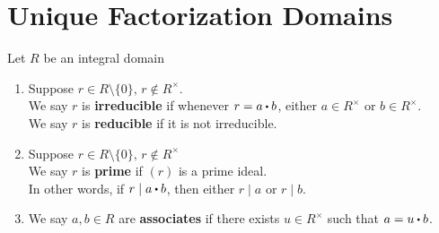 \documentclass[../Main.tex]{subfiles}
\begin{document}
\chapter{Unique Factorization Domains}
\begin{dfn}[title = {Irreducible/Reducible, Prime, Associate Elements}]
	Let $R$ be an integral domain
	\begin{enumerate}
		\item Suppose $r\in R\setminus\{0\},\, r\notin R^\times$.\\
		We say $r$ is \textbf{irreducible} if whenever $r=a\rdot b$, either $a\in R^\times$ or $b\in R^\times$.\\
		We say $r$ is \textbf{reducible} if it is not irreducible.
		\item Suppose $r\in R\setminus\{0\},\, r\notin R^\times$\\
		We say $r$ is \textbf{prime} if $(r)$ is a prime ideal.\\
		In other words, if $r\mid a\rdot b$, then either $r\mid a$ or $r\mid b$.
		\item We say $a,b \in R$ are \textbf{associates} if there exists $u\in R^\times$ such that $a=u\rdot b$.
	\end{enumerate}
\end{dfn}
\end{document}
